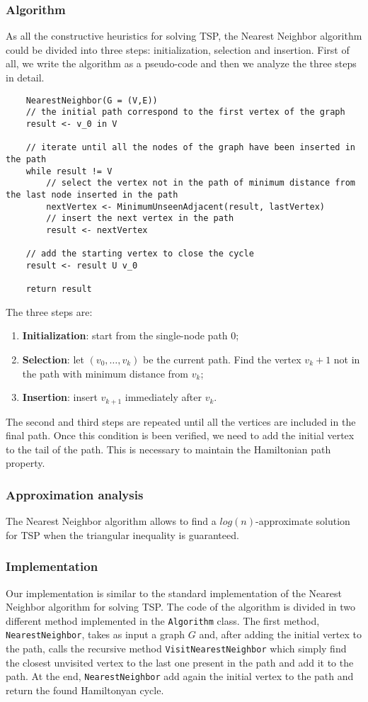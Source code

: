 \subsubsection{Algorithm}
As all the constructive heuristics for solving TSP, the Nearest Neighbor algorithm could be divided into three steps: initialization, selection and insertion. First of all, we write the algorithm as a pseudo-code and then we analyze the three steps in detail.

\begin{verbatim}
    NearestNeighbor(G = (V,E))
    // the initial path correspond to the first vertex of the graph
    result <- v_0 in V
    
    // iterate until all the nodes of the graph have been inserted in the path
    while result != V
        // select the vertex not in the path of minimum distance from the last node inserted in the path
        nextVertex <- MinimumUnseenAdjacent(result, lastVertex)
        // insert the next vertex in the path
        result <- nextVertex
    
    // add the starting vertex to close the cycle
    result <- result U v_0
    
    return result
\end{verbatim}

The three steps are:
\begin{enumerate}
    \item \textbf{Initialization}: start from the single-node path 0;
    \item \textbf{Selection}: let $(v_0, \dots, v_k)$ be the current path. Find the vertex $v_k+1$ not in the path with minimum distance from $v_k$;
    \item \textbf{Insertion}: insert $v_{k+1}$ immediately after $v_k$.
\end{enumerate}
The second and third steps are repeated until all the vertices are included in the final path. Once this condition is been verified, we need to add the initial vertex to the tail of the path. This is necessary to maintain the Hamiltonian path property.

\subsubsection{Approximation analysis}
The Nearest Neighbor algorithm allows to find a $log(n)$-approximate solution for TSP when the triangular inequality is guaranteed.

\subsubsection{Implementation}
Our implementation is similar to the standard implementation of the Nearest Neighbor algorithm for solving TSP. The code of the algorithm is divided in two different method implemented in the \verb|Algorithm| class.
The first method, \verb|NearestNeighbor|, takes as input a graph $G$ and, after adding the initial vertex to the path, calls the recursive method \verb|VisitNearestNeighbor| which simply find the closest unvisited vertex to the last one present in the path and add it to the path. At the end, \verb|NearestNeighbor| add again the initial vertex to the path and return the found Hamiltonyan cycle.

